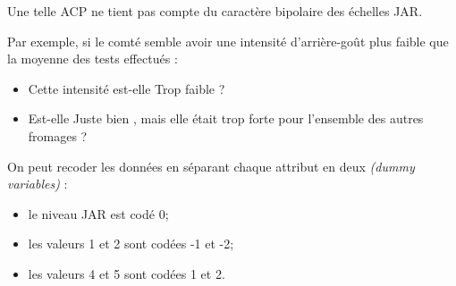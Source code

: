 \documentclass[aspectratio=169,xcolor=dvipsnames]{beamer}
\begin{document}
\begin{frame}
	\textcolor{nyubluedarker}{\faCogs} Une telle ACP ne tient pas compte du caractère bipolaire des échelles JAR.
	
	\medskip
	
		\textcolor{nyubluedarker}{\faCogs} Par exemple, si le comté semble avoir une intensité d'arrière-goût plus faible que la moyenne des tests effectués :
			\begin{itemize}
			\item Cette intensité est-elle \og Trop faible \fg{} ?
			\item Est-elle \og Juste bien \fg{}, mais elle était trop forte pour l'ensemble des autres fromages ?  
			\end{itemize}
			
	\medskip
	
	\textcolor{nyubluedarker}{\faLightbulb[regular]} On peut recoder les données en séparant chaque attribut en deux \emph{(dummy variables)} :
		\begin{itemize}
		\item le niveau JAR est codé 0;
		\item les valeurs 1 et 2 sont codées -1 et -2;
		\item les valeurs 4 et 5 sont codées 1 et 2.
		\end{itemize}
\end{frame}
\end{document}
